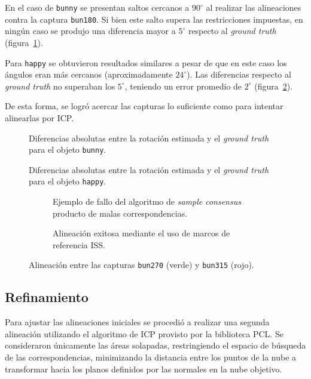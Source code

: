 			En el caso de \texttt{bunny} se presentan saltos cercanos a $90^{\circ}$ al realizar las alineaciones
			contra la captura \texttt{bun180}. Si bien este salto supera las restricciones impuestas,
			en ningún caso se produjo una diferencia mayor a $5^{\circ}$ respecto al \emph{ground truth} (figura~\ref{fig:clust_bunny}).

			Para \texttt{happy} se obtuvieron resultados similares a pesar de que en este
			caso los ángulos eran más cercanos (aproximadamente $24^{\circ}$).  Las
			diferencias respecto al \emph{ground truth} no superaban los $5^{\circ}$,
			teniendo un error promedio de $2^{\circ}$ (figura~\ref{fig:clust_happy}).

			De esta forma, se logró acercar las capturas lo suficiente como
			para intentar alinearlas por ICP.

		\begin{figure}
			\resizebox{.9\linewidth}{!}{}
			\caption{\label{fig:clust_bunny}Diferencias absolutas entre la rotación estimada y el \emph{ground truth} para el objeto \texttt{bunny}.}
		\end{figure}

		\begin{figure}
			\resizebox{.9\linewidth}{!}{}
			\caption{\label{fig:clust_happy}Diferencias absolutas entre la rotación estimada y el \emph{ground truth} para el objeto \texttt{happy}.}
		\end{figure}

		\begin{figure}
			\centering
			\begin{subfigure}{.8\linewidth}
				\caption{\label{fig:align_sac}Ejemplo de fallo del algoritmo de \emph{sample consensus} producto de malas correspondencias.}
			\end{subfigure}
			\begin{subfigure}{.8\linewidth}
				\caption{\label{fig:clust_bun_good}Alineación exitosa mediante el uso de marcos de referencia ISS.}
			\end{subfigure}
			\caption{Alineación entre las capturas \texttt{bun270} (verde) y \texttt{bun315} (rojo).}
		\end{figure}


	\subsection{Refinamiento}
	Para ajustar las alineaciones iniciales se procedió a realizar una segunda alineación utilizando
	el algoritmo de ICP provisto por la biblioteca PCL.
	Se consideraron únicamente las áreas solapadas, restringiendo el espacio de
	búsqueda de las correspondencias, minimizando la distancia entre los puntos
	de la nube a transformar hacia los planos definidos por las normales en la nube objetivo.

